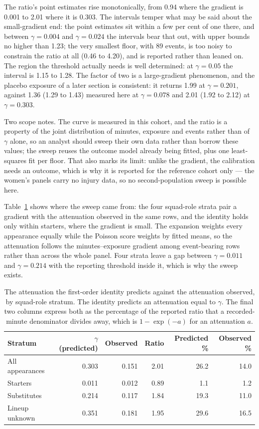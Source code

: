 \documentclass[11pt]{article}
\begin{document}
The ratio's point estimates rise monotonically, from 0.94 where the gradient is 0.001 to 2.01 where it is 0.303. The intervals temper what may be said about the small-gradient end: the point estimates sit within a few per cent of one there, and between $\gamma=0.004$ and $\gamma=0.024$ the intervals bear that out, with upper bounds no higher than 1.23; the very smallest floor, with 89 events, is too noisy to constrain the ratio at all (0.46 to 4.20), and is reported rather than leaned on. The region the threshold actually needs is well determined: at $\gamma=0.05$ the interval is 1.15 to 1.28. The factor of two is a large-gradient phenomenon, and the placebo exposure of a later section is consistent: it returns 1.99 at $\gamma=0.201$, against 1.36 (1.29 to 1.43) measured here at $\gamma=0.078$ and 2.01 (1.92 to 2.12) at $\gamma=0.303$.

Two scope notes. The curve is measured in this cohort, and the ratio is a property of the joint distribution of minutes, exposure and events rather than of $\gamma$ alone, so an analyst should sweep their own data rather than borrow these values; the sweep reuses the outcome model already being fitted, plus one least-squares fit per floor. That also marks its limit: unlike the gradient, the calibration needs an outcome, which is why it is reported for the reference cohort only --- the women's panels carry no injury data, so no second-population sweep is possible here.

Table~\ref{tab:supp_calibration} shows where the sweep came from: the four squad-role strata pair a gradient with the attenuation observed in the same rows, and the identity holds only within starters, where the gradient is small. The expansion weights every appearance equally while the Poisson score weights by fitted means, so the attenuation follows the minutes--exposure gradient among event-bearing rows rather than across the whole panel. Four strata leave a gap between $\gamma=0.011$ and $\gamma=0.214$ with the reporting threshold inside it, which is why the sweep exists.

\begin{table}[h]
\centering
\caption{The attenuation the first-order identity predicts against the attenuation observed, by squad-role stratum. The identity predicts an attenuation equal to $\gamma$. The final two columns express both as the percentage of the reported ratio that a recorded-minute denominator divides away, which is $1-\exp(-a)$ for an attenuation $a$.}
\label{tab:supp_calibration}
\footnotesize
\setlength{\tabcolsep}{5pt}
\begin{tabular}{lrrrrr}
\toprule
Stratum & $\gamma$ (predicted) & Observed & Ratio & Predicted \% & Observed \%\\
\midrule
All appearances & 0.303 & 0.151 & 2.01 & 26.2 & 14.0\\
Starters & 0.011 & 0.012 & 0.89 & 1.1 & 1.2\\
Substitutes & 0.214 & 0.117 & 1.84 & 19.3 & 11.0\\
Lineup unknown & 0.351 & 0.181 & 1.95 & 29.6 & 16.5\\
\bottomrule
\end{tabular}
\end{table}
\end{document}
